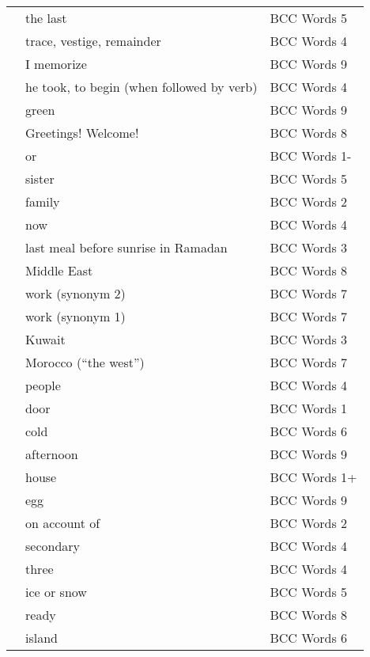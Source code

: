 \documentclass[10pt,twocolumn]{article}
\begin{document}
\begin{supertabular*}{\linewidth}{p{0.1\textwidth}p{0.2\textwidth}>{\footnotesize}p{0.2\textwidth}}
 & the last & BCC Words 5 \\
 & trace, vestige, remainder & BCC Words 4 \\
 & I memorize & BCC Words 9 \\
 & he took, to begin (when followed by verb) & BCC Words 4 \\
 & green & BCC Words 9 \\
 & Greetings! Welcome! & BCC Words 8 \\
 & or & BCC Words 1- \\
 & sister & BCC Words 5 \\
 & family & BCC Words 2 \\
 & now & BCC Words 4 \\
 & last meal before sunrise in Ramadan & BCC Words 3 \\
 & Middle East & BCC Words 8 \\
 & work (synonym 2) & BCC Words 7 \\
 & work (synonym 1) & BCC Words 7 \\
 & Kuwait & BCC Words 3 \\
 & Morocco (``the west'') & BCC Words 7 \\
 & people & BCC Words 4 \\
 & door & BCC Words 1 \\
 & cold & BCC Words 6 \\
 & afternoon & BCC Words 9 \\
 & house & BCC Words 1+ \\
 & egg & BCC Words 9 \\
 & on account of & BCC Words 2 \\
 & secondary & BCC Words 4 \\
 & three & BCC Words 4 \\
 & ice or snow & BCC Words 5 \\
 & ready & BCC Words 8 \\
 & island & BCC Words 6 \\

\end{supertabular*}
\end{document}
